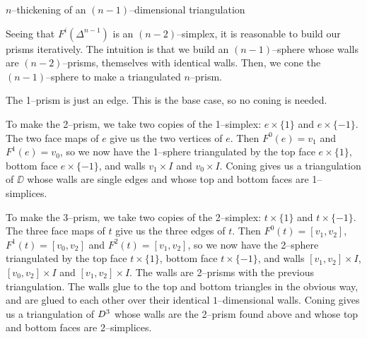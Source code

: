 \begin{algorithm}[h]
	\caption{$n$--thickening of an $(n-1)$--dimensional triangulation}
	\label{alg:stein2cells}
\end{algorithm}


Seeing that $F^i(\Delta^{n-1})$ is an $(n-2)$--simplex, it is reasonable to build our prisms iteratively.
The intuition is that we build an $(n-1)$--sphere whose walls are $(n-2)$--prisms, themselves with identical walls.
Then, we cone the $(n-1)$--sphere to make a triangulated $n$--prism.

The 1--prism is just an edge.
This is the base case, so no coning is needed.

To make the 2--prism, we take two copies of the 1--simplex: $e\times\{1\}$ and $e\times\{-1\}$.
The two face maps of $e$ give us the two vertices of $e$.
Then $F^0(e)=v_1$ and $F^1(e)=v_0$, so we now have the 1--sphere triangulated by the top face $e\times\{1\}$, bottom face $e\times\{-1\}$, and walls $v_1\times I$ and $v_0\times I$.
Coning gives us a triangulation of $\DD$ whose walls are single edges and whose top and bottom faces are 1--simplices.

To make the 3--prism, we take two copies of the 2--simplex: $t\times\{1\}$ and $t\times\{-1\}$.
The three face maps of $t$ give us the three edges of $t$.
Then $F^0(t)=[v_1,v_2]$, $F^1(t)=[v_0,v_2]$ and $F^2(t)=[v_1,v_2]$, so we now have the 2--sphere triangulated by the top face $t\times\{1\}$, bottom face $t\times\{-1\}$, and walls $[v_1,v_2]\times I$, $[v_0,v_2]\times I$ and $[v_1,v_2]\times I$.
The walls are 2--prisms with the previous triangulation.
The walls glue to the top and bottom triangles in the obvious way, and are glued to each other over their identical $1$--dimensional walls.
Coning gives us a triangulation of $D^3$ whose walls are the 2--prism found above and whose top and bottom faces are 2--simplices.

